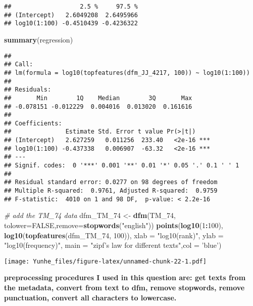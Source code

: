 \documentclass[]{article}
\newenvironment{Shaded}{\begin{snugshade}}{\end{snugshade}}
\newcommand{\KeywordTok}[1]{\textcolor[rgb]{0.13,0.29,0.53}{\textbf{#1}}}
\newcommand{\DataTypeTok}[1]{\textcolor[rgb]{0.13,0.29,0.53}{#1}}
\newcommand{\DecValTok}[1]{\textcolor[rgb]{0.00,0.00,0.81}{#1}}
\newcommand{\StringTok}[1]{\textcolor[rgb]{0.31,0.60,0.02}{#1}}
\newcommand{\CommentTok}[1]{\textcolor[rgb]{0.56,0.35,0.01}{\textit{#1}}}
\newcommand{\OtherTok}[1]{\textcolor[rgb]{0.56,0.35,0.01}{#1}}
\newcommand{\OperatorTok}[1]{\textcolor[rgb]{0.81,0.36,0.00}{\textbf{#1}}}
\newcommand{\NormalTok}[1]{#1}
\begin{document}
\begin{verbatim}
##                   2.5 %     97.5 %
## (Intercept)   2.6049208  2.6495966
## log10(1:100) -0.4510439 -0.4236322
\end{verbatim}

\begin{Shaded}
\begin{Highlighting}[]
\KeywordTok{summary}\NormalTok{(regression)}
\end{Highlighting}
\end{Shaded}

\begin{verbatim}
## 
## Call:
## lm(formula = log10(topfeatures(dfm_JJ_4217, 100)) ~ log10(1:100))
## 
## Residuals:
##       Min        1Q    Median        3Q       Max 
## -0.078151 -0.012229  0.004016  0.013020  0.161616 
## 
## Coefficients:
##               Estimate Std. Error t value Pr(>|t|)    
## (Intercept)   2.627259   0.011256  233.40   <2e-16 ***
## log10(1:100) -0.437338   0.006907  -63.32   <2e-16 ***
## ---
## Signif. codes:  0 '***' 0.001 '**' 0.01 '*' 0.05 '.' 0.1 ' ' 1
## 
## Residual standard error: 0.0277 on 98 degrees of freedom
## Multiple R-squared:  0.9761, Adjusted R-squared:  0.9759 
## F-statistic:  4010 on 1 and 98 DF,  p-value: < 2.2e-16
\end{verbatim}

\begin{Shaded}
\begin{Highlighting}[]
\CommentTok{# add the TM_74 data}
\NormalTok{dfm_TM_}\DecValTok{74}\NormalTok{ <-}\StringTok{ }\KeywordTok{dfm}\NormalTok{(TM_}\DecValTok{74}\NormalTok{, }\DataTypeTok{tolower=}\OtherTok{FALSE}\NormalTok{,}\DataTypeTok{remove=}\KeywordTok{stopwords}\NormalTok{(}\StringTok{"english"}\NormalTok{))}
\KeywordTok{points}\NormalTok{(}\KeywordTok{log10}\NormalTok{(}\DecValTok{1}\OperatorTok{:}\DecValTok{100}\NormalTok{), }\KeywordTok{log10}\NormalTok{(}\KeywordTok{topfeatures}\NormalTok{(dfm_TM_}\DecValTok{74}\NormalTok{, }\DecValTok{100}\NormalTok{)),}
     \DataTypeTok{xlab =} \StringTok{"log10(rank)"}\NormalTok{, }\DataTypeTok{ylab =} \StringTok{"log10(frequency)"}\NormalTok{, }\DataTypeTok{main =} \StringTok{"zipf's law for different texts"}\NormalTok{,}\DataTypeTok{col =} \StringTok{'blue'}\NormalTok{)}
\end{Highlighting}
\end{Shaded}

\texttt{[image: Yunhe\_files/figure-latex/unnamed-chunk-22-1.pdf]}

\textbf{preprocessing procedures I used in this question are: get texts
from the metadata, convert from text to dfm, remove stopwords, remove
punctuation, convert all characters to lowercase. }
\end{document}
